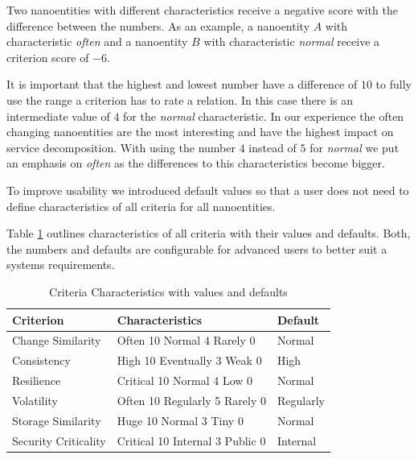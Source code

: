 Two nanoentities with different characteristics receive a negative score with the difference between the numbers. As an example, a nanoentity $A$ with characteristic \textit{often} and a nanoentity $B$ with characteristic \textit{normal} receive a criterion score of $-6$. 

It is important that the highest and lowest number have a difference of $10$ to fully use the range a criterion has to rate a relation. \newline In this case there is an intermediate value of $4$ for the \textit{normal} characteristic. In our experience the often changing nanoentities are the most interesting and have the highest impact on service decomposition. With using the number $4$ instead of $5$ for \textit{normal} we put an emphasis on \textit{often} as the differences to this characteristics become bigger. 

To improve usability we introduced default values so that a user does not need to define characteristics of all criteria for all nanoentities. 

Table \ref{tab:characteristics} outlines characteristics of all criteria with their values and defaults. Both, the numbers and defaults are configurable for advanced users to better suit a systems requirements. 

\begin{table}[H]
	\centering
	\caption{Criteria Characteristics with values and defaults}
	\label{tab:characteristics}
	\begin{tabular}{|p{100pt}|p{80pt}|p{60pt}|}
		\hline	
		\textbf Criterion & Characteristics & Default\\
		\hline
		Change Similarity & Often 10 \newline Normal 4 \newline Rarely 0 & Normal\\
		\hline
		Consistency & High 10 \newline Eventually 3 \newline Weak 0 & High\\
		\hline
		Resilience & Critical 10 \newline Normal 4 \newline Low 0 & Normal\\
		\hline
		Volatility & Often 10 \newline Regularly 5 \newline Rarely 0 & Regularly \\
		\hline
		Storage Similarity & Huge 10 \newline Normal 3 \newline Tiny 0 & Normal\\
		\hline
		Security Criticality & Critical 10 \newline Internal 3 \newline Public 0 & Internal\\
		\hline
	\end{tabular}
\end{table}





